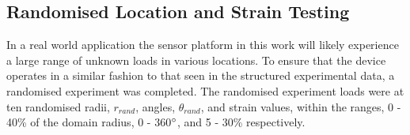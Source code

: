 


\subsection{Randomised Location and Strain Testing}
In a real world application the sensor platform in this work will likely experience a large range of unknown loads in various locations. To ensure that the device operates in a similar fashion to that seen in the structured experimental data, a randomised experiment was completed. The randomised experiment loads were at ten randomised radii, $r_{rand}$, angles, $\theta_{rand}$, and strain values, within the ranges, 0 - 40\% of the domain radius, 0 - 360$\degree$, and  5 - 30\% respectively.


